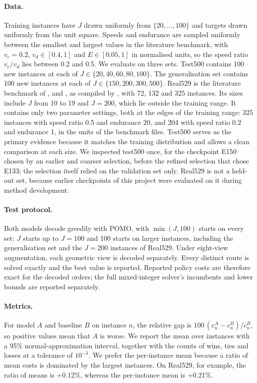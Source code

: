 \documentclass[preprint,12pt,authoryear]{elsarticle}
\begin{document}
\paragraph{Data.} Training instances have $J$ drawn uniformly from $\{20,\dots,100\}$ and targets drawn uniformly from the unit square. Speeds and endurance are sampled uniformly between the smallest and largest values in the literature benchmark, with $v_{c} = 0.2$, $v_{d} \in [0.4, 1]$ and $E \in [0.05, 1]$ in normalised units, so the speed ratio $v_{c}/v_{d}$ lies between 0.2 and 0.5. We evaluate on three sets. Test500 contains 100 new instances at each of $J \in \{20,40,60,80,100\}$. The generalisation set contains 100 new instances at each of $J \in \{150,200,300,500\}$. Real529 is the literature benchmark of \citet{gambella2018}, \citet{erdogan2021} and \citet{poikonen2020}, as compiled by \citet{li2025}, with 72, 132 and 325 instances. Its sizes include $J$ from 10 to 19 and $J = 200$, which lie outside the training range. It contains only two parameter settings, both at the edges of the training range: 325 instances with speed ratio 0.5 and endurance 20, and 204 with speed ratio 0.2 and endurance 1, in the units of the benchmark files. Test500 serves as the primary evidence because it matches the training distribution and allows a clean comparison at each size. We inspected test500 once, for the checkpoint E150 chosen by an earlier and coarser selection, before the refined selection that chose E133; the selection itself relied on the validation set only. Real529 is not a held-out set, because earlier checkpoints of this project were evaluated on it during method development.

\paragraph{Test protocol.} Both models decode greedily with POMO, with $\min(J,100)$ starts on every set: $J$ starts up to $J = 100$ and 100 starts on larger instances, including the generalisation set and the $J = 200$ instances of Real529. Under eight-view augmentation, each geometric view is decoded separately. Every distinct route is solved exactly and the best value is reported. Reported policy costs are therefore exact for the decoded orders; the full mixed-integer solver's incumbents and lower bounds are reported separately.

\paragraph{Metrics.} For model $A$ and baseline $B$ on instance $n$, the relative gap is $100\,(c^{A}_{n} - c^{B}_{n})/c^{B}_{n}$, so positive values mean that $A$ is worse. We report the mean over instances with a 95\% normal-approximation interval, together with the counts of wins, ties and losses at a tolerance of $10^{-3}$. We prefer the per-instance mean because a ratio of mean costs is dominated by the largest instances. On Real529, for example, the ratio of means is +0.12\%, whereas the per-instance mean is +0.21\%.
\end{document}
